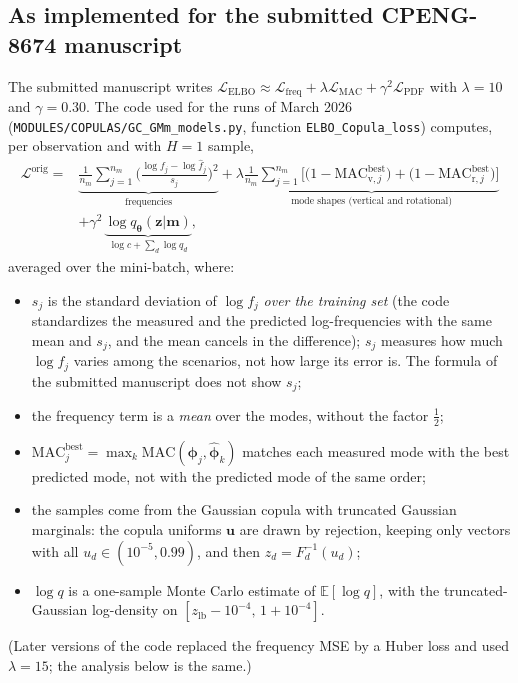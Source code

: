 \documentclass[11pt,a4paper]{article}
\numberwithin{equation}{section}
\theoremstyle{plain}
\theoremstyle{definition}
\theoremstyle{remark}
\newcommand{\m}{\mathbf{m}}
\newcommand{\z}{\mathbf{z}}
\newcommand{\uu}{\mathbf{u}}
\newcommand{\E}{\mathbb{E}}
\newcommand{\ELBO}{\mathrm{ELBO}}
\newcommand{\MAC}{\mathrm{MAC}}
\newcommand{\Lc}{\mathcal{L}}
\newcommand{\zlb}{z_{\text{lb}}}
\newcommand{\qth}{q_{\bm{\theta}}}
\begin{document}
\subsection{As implemented for the submitted CPENG-8674 manuscript}
The submitted manuscript writes $\Lc_{\ELBO}\approx\Lc_{\text{freq}}+\lambda\Lc_{\text{MAC}}+\gamma^2\Lc_{\text{PDF}}$ with $\lambda=10$ and $\gamma=0.30$. The code used for the runs of March 2026 (\texttt{MODULES/COPULAS/GC\_GMm\_models.py}, function \texttt{ELBO\_Copula\_loss}) computes, per observation and with $H=1$ sample,
\begin{equation}
\begin{aligned}
\Lc^{\text{orig}}={}&
\underbrace{\frac1{n_m}\sum_{j=1}^{n_m}\Big(\frac{\log f_j-\log\hat f_j}{s_j}\Big)^2}_{\text{frequencies}}
+\lambda\underbrace{\frac1{n_m}\sum_{j=1}^{n_m}\Big[\big(1-\MAC^{\text{best}}_{\text{v},j}\big)+\big(1-\MAC^{\text{best}}_{\text{r},j}\big)\Big]}_{\text{mode shapes (vertical and rotational)}}\\
&+\gamma^2\,\underbrace{\log\qth(\z|\m)}_{\log c+\sum_d\log q_d},
\end{aligned}
\label{eq:orig_loss}
\end{equation}
averaged over the mini-batch, where:
\begin{itemize}
\item $s_j$ is the standard deviation of $\log f_j$ \emph{over the training set} (the code standardizes the measured and the predicted log-frequencies with the same mean and $s_j$, and the mean cancels in the difference); $s_j$ measures how much $\log f_j$ varies among the scenarios, not how large its error is. The formula of the submitted manuscript does not show $s_j$;
\item the frequency term is a \emph{mean} over the modes, without the factor $\tfrac12$;
\item $\MAC^{\text{best}}_j=\max_k\MAC(\bm\phi_j,\hat{\bm\phi}_k)$ matches each measured mode with the best predicted mode, not with the predicted mode of the same order;
\item the samples come from the Gaussian copula with truncated Gaussian marginals: the copula uniforms $\uu$ are drawn by rejection, keeping only vectors with all $u_d\in(10^{-5},0.99)$, and then $z_d=F_d^{-1}(u_d)$;
\item $\log q$ is a one-sample Monte Carlo estimate of $\E[\log q]$, with the truncated-Gaussian log-density on $[\zlb-10^{-4},\,1+10^{-4}]$.
\end{itemize}
(Later versions of the code replaced the frequency MSE by a Huber loss and used $\lambda=15$; the analysis below is the same.)
\end{document}
